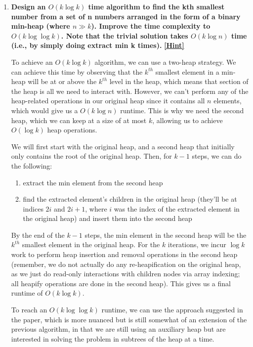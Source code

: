\documentclass[12pt]{article}
\begin{document}
\begin{enumerate}
    \item \textbf{Design an $O(k\log k)$ time algorithm to find the kth smallest number from a set 
    of n numbers arranged in the form of a binary min-heap (where $n \gg k$). Improve the time 
    complexity to $O(k\log \log k)$. Note that the trivial solution takes $O(k\log n)$ time (i.e., 
    by simply doing extract min k times).}
    \href{http://160592857366.free.fr/joe/ebooks/ShareData/An%20Optimal%20Algorithm%20for%20Selection%20in%20a%20Min-Heap.pdf}{\textbf{[Hint]}}

    To achieve an $O(k\log k)$ algorithm, we can use a two-heap strategy. We can achieve this time by observing that 
    the $k^{th}$ smallest element in a min-heap will be at or above the $k^{th}$ level in the heap, which means 
    that section of the heap is all we need to interact with. However, we can't perform any of the heap-related operations 
    in our original heap since it contains all $n$ elements, which would give us a $O(k\log n)$ runtime. This is why 
    we need the second heap, which we can keep at a size of at most $k$, allowing us to achieve $O(\log k)$ heap operations.
    
    We will first start with the original heap, and a second heap that initially only contains the root of the original 
    heap. Then, for $k - 1$ steps, we can do the following:

    \begin{enumerate}
        \item extract the min element from the second heap
        \item find the extracted element's children in the original heap (they'll be at indices $2i$ and $2i + 1$, where 
        $i$ was the index of the extracted element in the original heap) and insert them into the second heap
    \end{enumerate}

    By the end of the $k - 1$ steps, the min element in the second heap will be the $k^{th}$ smallest element in the original 
    heap. For the $k$ iterations, we incur $\log k$ work to perform heap insertion and removal operations in the 
    second heap (remember, we do not actually do any re-heapification on the original heap, as we just do read-only interactions 
    with children nodes via array indexing; all heapify operations are done in the second heap). This gives us a final 
    runtime of $O(k\log k)$.

    To reach an $O(k\log \log k)$ runtime, we can use the approach suggested in the paper, which is more nuanced but is 
    still somewhat of an extension of the previous algorithm, in that we are still using an auxiliary heap but are 
    interested in solving the problem in subtrees of the heap at a time.


\end{enumerate}
\end{document}
